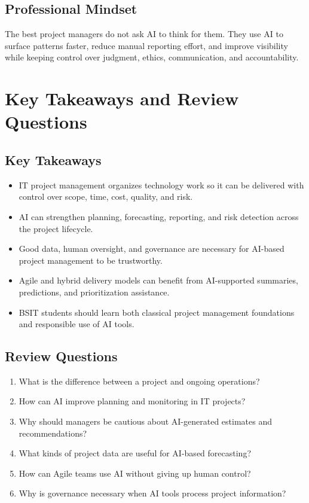 \documentclass[11pt,a4paper]{article}
\begin{document}
\subsection{Professional Mindset}

\begin{conceptbox}
The best project managers do not ask AI to think for them. They use AI to surface patterns faster, reduce manual reporting effort, and improve visibility while keeping control over judgment, ethics, communication, and accountability.
\end{conceptbox}

\section{Key Takeaways and Review Questions}

\subsection{Key Takeaways}

\begin{itemize}[leftmargin=*]
  \item IT project management organizes technology work so it can be delivered with control over scope, time, cost, quality, and risk.
  \item AI can strengthen planning, forecasting, reporting, and risk detection across the project lifecycle.
  \item Good data, human oversight, and governance are necessary for AI-based project management to be trustworthy.
  \item Agile and hybrid delivery models can benefit from AI-supported summaries, predictions, and prioritization assistance.
  \item BSIT students should learn both classical project management foundations and responsible use of AI tools.
\end{itemize}

\subsection{Review Questions}

\begin{enumerate}[leftmargin=*]
  \item What is the difference between a project and ongoing operations?
  \item How can AI improve planning and monitoring in IT projects?
  \item Why should managers be cautious about AI-generated estimates and recommendations?
  \item What kinds of project data are useful for AI-based forecasting?
  \item How can Agile teams use AI without giving up human control?
  \item Why is governance necessary when AI tools process project information?
\end{enumerate}
\end{document}

